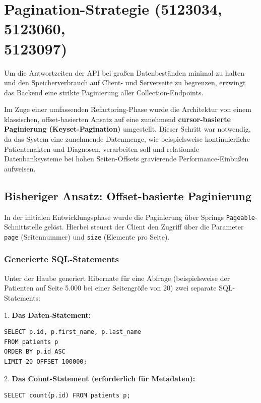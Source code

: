 \section{Pagination-Strategie (5123034, 5123060, \\5123097)}
\label{sec:pagination_strategie}

Um die Antwortzeiten der API bei großen Datenbeständen minimal zu halten und den Speicherverbrauch auf Client- und Serverseite zu begrenzen, erzwingt das Backend eine strikte Paginierung aller Collection-Endpoints. 

Im Zuge einer umfassenden Refactoring-Phase wurde die Architektur von einem klassischen, offset-basierten Ansatz auf eine zunehmend \textbf{cursor-basierte Paginierung (Keyset-Pagination)} umgestellt.
Dieser Schritt war notwendig, da das System eine zunehmende Datenmenge, wie beispielsweise kontinuierliche Patientenakten und Diagnosen, verarbeiten soll und relationale Datenbanksysteme bei hohen Seiten-Offsets gravierende Performance-Einbußen aufweisen.

\subsection{Bisheriger Ansatz: Offset-basierte Paginierung}
In der initialen Entwicklungsphase wurde die Paginierung über Springs \texttt{Pageable}-Schnittstelle gelöst. Hierbei steuert der Client den Zugriff über die Parameter \texttt{page} (Seitennummer) und \texttt{size} (Elemente pro Seite).

\subsubsection*{Generierte SQL-Statements}
Unter der Haube generiert Hibernate für eine Abfrage (beispielsweise der Patienten auf Seite 5.000 bei einer Seitengröße von 20) zwei separate SQL-Statements:

1. \textbf{Das Daten-Statement:}
\begin{lstlisting}[style=sqlstyle]
SELECT p.id, p.first_name, p.last_name 
FROM patients p 
ORDER BY p.id ASC 
LIMIT 20 OFFSET 100000;
\end{lstlisting}

2. \textbf{Das Count-Statement (erforderlich für Metadaten):}
\begin{lstlisting}[style=sqlstyle]
SELECT count(p.id) FROM patients p;
\end{lstlisting}

